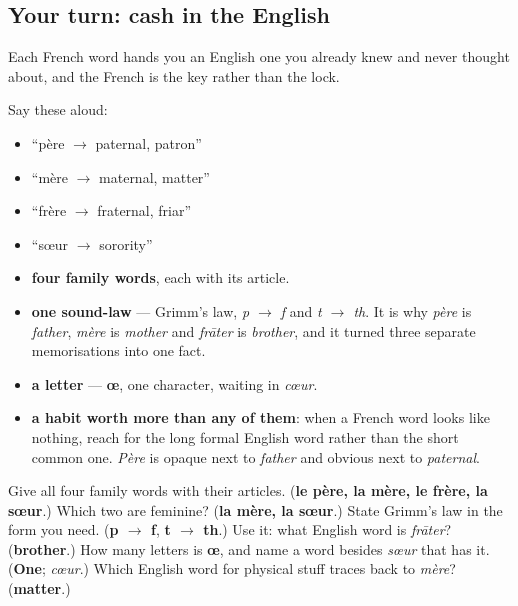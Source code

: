\subsection*{Your turn: cash in the English}
Each French word hands you an English one you already knew and never thought about, and the French is the key rather than the lock.

Say these aloud:

\begin{itemize}
\raggedright
  \item \textquotedblleft{}père $\to$ paternal, patron\textquotedblright{}
  \item \textquotedblleft{}mère $\to$ maternal, matter\textquotedblright{}
  \item \textquotedblleft{}frère $\to$ fraternal, friar\textquotedblright{}
  \item \textquotedblleft{}sœur $\to$ sorority\textquotedblright{}
\end{itemize}

\begin{grammarlens}[title={What you've built this chapter}]
\begin{itemize}
\raggedright
  \item \textbf{four family words}, each with its article.
  \item \textbf{one sound-law} — Grimm's law, \emph{p $\to$ f} and \emph{t $\to$ th}. It is why \emph{père} is \emph{father}, \emph{mère} is \emph{mother} and \emph{frāter} is \emph{brother}, and it turned three separate memorisations into one fact.
  \item \textbf{a letter} — \textbf{œ}, one character, waiting in \emph{cœur}.
  \item \textbf{a habit worth more than any of them}: when a French word looks like nothing, reach for the long formal English word rather than the short common one. \emph{Père} is opaque next to \emph{father} and obvious next to \emph{paternal}.
\end{itemize}
\end{grammarlens}

\begin{tcolorbox}[breakable,colback=teal!4,colframe=teal!35!black,title={Before you move on}]
Give all four family words with their articles. (\textbf{le père, la mère, le frère, la sœur}.) Which two are feminine? (\textbf{la mère, la sœur}.) State Grimm's law in the form you need. (\textbf{p $\to$ f}, \textbf{t $\to$ th}.) Use it: what English word is \emph{frāter}? (\textbf{brother}.) How many letters is \textbf{œ}, and name a word besides \emph{sœur} that has it. (\textbf{One}; \emph{cœur}.) Which English word for physical stuff traces back to \emph{mère}? (\textbf{matter}.)
\end{tcolorbox}
